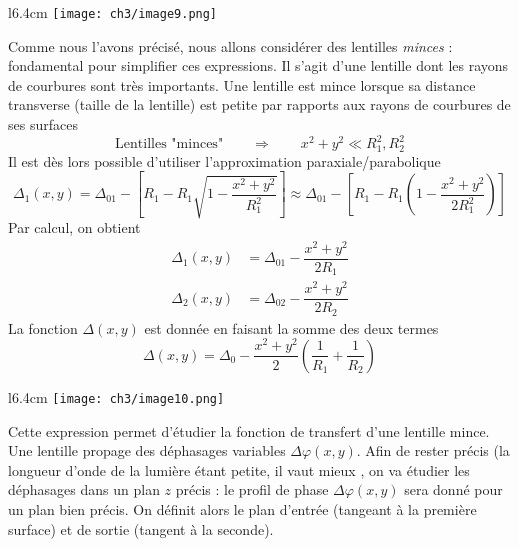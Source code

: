 	\begin{wrapfigure}[9]{l}{6.4cm}
	\vspace{-5mm}
	\texttt{[image: ch3/image9.png]}
	\end{wrapfigure}	
	Comme nous l'avons précisé, nous allons considérer des lentilles \textit{minces} : fondamental 
	pour simplifier ces expressions. Il s'agit d'une lentille dont les rayons de courbures sont 
	très importants. Une lentille est mince lorsque sa distance transverse (taille de la lentille) 
	est petite par rapports aux rayons de courbures de ses surfaces 
	\begin{equation}
	\text{Lentilles "minces"} \qquad\Longrightarrow\qquad x^2+y^2 \ll R_1^2,R_2^2
	\end{equation}
	Il est dès lors possible d'utiliser l'approximation paraxiale/parabolique 
	\begin{equation}
	\Delta_1(x,y) = \Delta_{01}-\left[R_1-R_1\sqrt{1-\dfrac{x^2+y^2}{R_1^2}}\right] \approx \Delta_{01} -
	\left[R_1-R_1\left(1-\dfrac{x^2+y^2}{2R_1^2}\right)\right]
	\end{equation}
	Par calcul, on obtient
	\begin{equation}
	\begin{array}{ll}
	\Delta_1(x,y) &= \Delta_{01} - \dfrac{x^2+y^2}{2R_1}\\
	\Delta_2(x,y) &= \Delta_{02} - \dfrac{x^2+y^2}{2R_2}
	\end{array}
	\end{equation}
	La fonction $\Delta(x,y)$ est donnée en faisant la somme des deux termes
	\begin{equation}
	\Delta(x,y) = \Delta_0-\dfrac{x^2+y^2}{2}\left(\frac{1}{R_1}+\frac{1}{R_2}\right)
	\end{equation}
	
		\begin{wrapfigure}[9]{l}{6.4cm}
	\vspace{-5mm}
	\texttt{[image: ch3/image10.png]}
	\end{wrapfigure}	
	Cette expression permet d'étudier la fonction de transfert d'une lentille mince. Une lentille 
	propage des déphasages variables $\Delta \varphi(x,y)$. Afin de rester précis (la longueur d'onde 
	de la lumière étant petite, il vaut mieux%
	, on va étudier les déphasages dans un plan $z$ précis : 
	le profil de phase $\Delta\varphi(x,y)$ sera donné pour un plan bien précis. On définit alors le plan 
	d'entrée (tangeant à la première surface) et de sortie (tangent à la seconde). 
	
